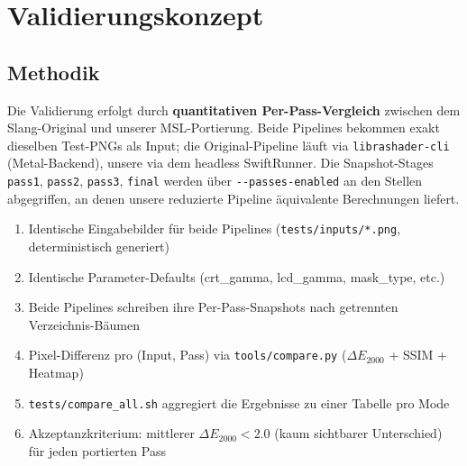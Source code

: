 \documentclass[11pt, a4paper]{article}
\begin{document}
\section{Validierungskonzept}
\vspace{.5cm}

\subsection{Methodik}
\vspace{.5cm}
Die Validierung erfolgt durch \textbf{quantitativen Per-Pass-Vergleich} zwischen dem Slang-Original und unserer MSL-Portierung. Beide Pipelines bekommen exakt dieselben Test-PNGs als Input; die Original-Pipeline l\"auft via \texttt{librashader-cli} (Metal-Backend), unsere via dem headless SwiftRunner. Die Snapshot-Stages \texttt{pass1}, \texttt{pass2}, \texttt{pass3}, \texttt{final} werden \"uber \verb|--passes-enabled| an den Stellen abgegriffen, an denen unsere reduzierte Pipeline \"aquivalente Berechnungen liefert.
\vspace{.25cm}
\begin{enumerate}[nosep]
    \item Identische Eingabebilder f\"ur beide Pipelines (\texttt{tests/inputs/*.png}, deterministisch generiert)
    \item Identische Parameter-Defaults (crt\_gamma, lcd\_gamma, mask\_type, etc.)
    \item Beide Pipelines schreiben ihre Per-Pass-Snapshots nach getrennten Verzeichnis-B\"aumen
    \item Pixel-Differenz pro (Input, Pass) via \texttt{tools/compare.py} ($\Delta E_{2000}$ + SSIM + Heatmap)
    \item \texttt{tests/compare\_all.sh} aggregiert die Ergebnisse zu einer Tabelle pro Mode
    \item Akzeptanzkriterium: mittlerer $\Delta E_{2000} < 2.0$ (kaum sichtbarer Unterschied) f\"ur jeden portierten Pass
\end{enumerate}

\vspace{.5cm}
\end{document}
